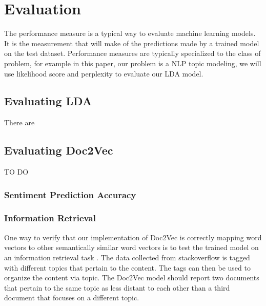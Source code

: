 
\section{Evaluation}
The performance measure is a typical way to evaluate machine learning models. It is the measurement that will make of the predictions made by a trained model on the test dataset. Performance measures are typically specialized to the class of problem, for example in this paper, our problem is a NLP topic modeling, we will use likelihood score and perplexity to evaluate our LDA model.

\subsection{Evaluating LDA}
There are 
\subsection{Evaluating Doc2Vec}
TO DO

\subsubsection{Sentiment Prediction Accuracy}
%
%
%
%

\subsubsection{Information Retrieval}

One way to verify that our implementation of Doc2Vec is correctly mapping word vectors to other semantically similar word vectors is to test the trained model on an information retrieval task . \cite{RefWorks:doc:5a6e5746e4b0d609eec798d7} The data collected from stackoverflow is tagged with different topics that pertain to the content. The tags can then be used to organize the content via topic. The Doc2Vec model should report two documents that pertain to the same topic as less distant to each other than a third document that focuses on a different topic.

%

